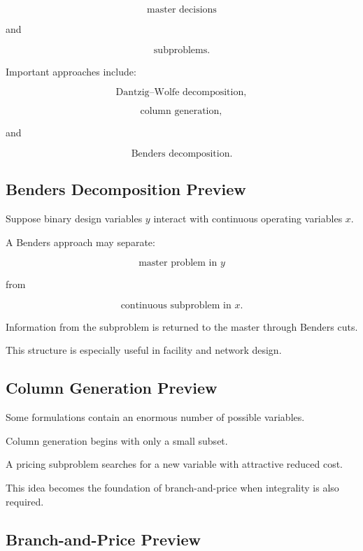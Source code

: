 \[
\boxed{
\text{master decisions}
}
\]

and

\[
\boxed{
\text{subproblems}.
}
\]

Important approaches include:

\[
\boxed{
\text{Dantzig--Wolfe decomposition},
}
\]

\[
\boxed{
\text{column generation},
}
\]

and

\[
\boxed{
\text{Benders decomposition}.
}
\]

\subsection{Benders Decomposition Preview}
\label{subsec:benders-decomposition-preview}

Suppose binary design variables \(y\) interact with continuous operating
variables \(x\).

A Benders approach may separate:

\[
\boxed{
\text{master problem in }y
}
\]

from

\[
\boxed{
\text{continuous subproblem in }x.
}
\]

Information from the subproblem is returned to the master through Benders
cuts.

This structure is especially useful in facility and network design.

\subsection{Column Generation Preview}
\label{subsec:integer-column-generation-preview}

Some formulations contain an enormous number of possible variables.

Column generation begins with only a small subset.

A pricing subproblem searches for a new variable with attractive reduced
cost.

This idea becomes the foundation of branch-and-price when integrality is
also required.

\subsection{Branch-and-Price Preview}
\label{subsec:branch-and-price-preview}

